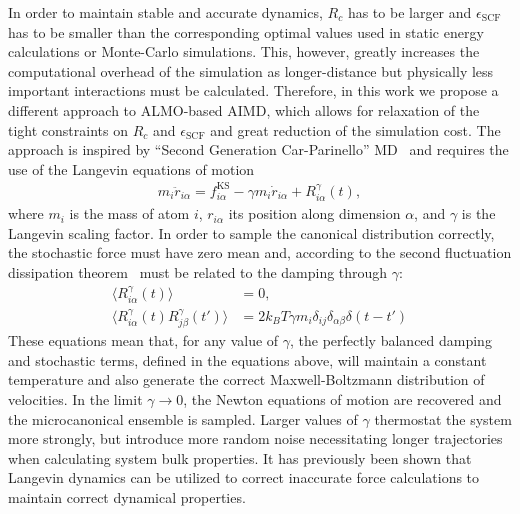 \documentclass[aps,prl,reprint,amsmath,amssymb]{revtex4-1}
\begin{document}
In order to maintain stable and accurate dynamics, $R_{c}$ has to be larger and $\epsilon_{\text{SCF}}$ has to be smaller than the corresponding optimal values used in static energy calculations or Monte-Carlo simulations. 
This, however, greatly increases the computational overhead of the simulation as longer-distance but physically less important interactions must be calculated. 
Therefore, in this work we propose a different approach to ALMO-based AIMD, which allows for relaxation of the tight constraints on $R_{c}$ and $\epsilon_{\text{SCF}}$ and great reduction of the simulation cost. The approach is inspired by ``Second Generation Car-Parinello'' MD~\cite{a:2ndcpmd} and requires the use of the Langevin equations of motion~\cite{a:Kubo-1986}
%
\begin{align}
\label{eq:langevin}
m_i \ddot{r}_{i\alpha} = f^{\text{KS}}_{i\alpha} - \gamma m_i \dot{r}_{i\alpha} + R^{\gamma}_{i\alpha} (t),
\end{align}
%
where $m_i$ is the mass of atom $i$, $r_{i\alpha}$ its position along dimension $\alpha$, and $\gamma$ is the Langevin scaling factor.
In order to sample the canonical distribution correctly, the stochastic force must have zero mean and, according to the second fluctuation dissipation theorem~\cite{a:Kubo-1986,b:tuckerman-stat} must be related to the damping through $\gamma$:
%
\begin{align}
\label{eq:stochastic}
\langle R^{\gamma}_{i\alpha} (t) \rangle &= 0, \\
\langle R^{\gamma}_{i\alpha} (t)  R^{\gamma}_{j\beta} (t') \rangle &= 2 k_B T \gamma m_i \delta_{ij} \delta_{\alpha\beta} \delta(t-t')
\end{align}
%
These equations mean that, for any value of $\gamma$, the perfectly balanced damping and stochastic terms, defined in the equations above, will maintain a constant temperature and also generate the correct Maxwell-Boltzmann distribution of velocities. In the limit $\gamma \rightarrow 0$, the Newton equations of motion are recovered and the microcanonical ensemble is sampled.
Larger values of $\gamma$ thermostat the system more strongly, but introduce more random noise necessitating longer trajectories when calculating system bulk properties.
It has previously been shown that Langevin dynamics can be utilized to correct inaccurate force calculations to maintain correct dynamical properties.~\cite{a:langevin-why,a:2ndcpmd,b:tuckerman-stat,a:ceriotti} 
\end{document}
